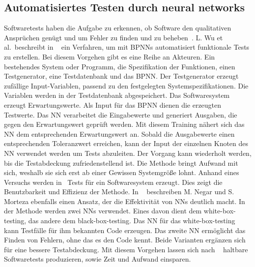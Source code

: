 \subsection{Automatisiertes Testen durch neural networks}
Softwaretests haben die Aufgabe zu erkennen, ob Software den qualitativen Ansprüchen genügt und um Fehler zu finden und zu beheben~\cite{Wu2008}.
L. Wu et al.~beschreibt in ~\cite{Wu2008} ein Verfahren, um mit BPNNs automatisiert funktionale Tests zu erstellen. 
Bei diesem Vorgehen gibt es eine Reihe an Akteuren. Ein bestehendes System oder Programm, die Spezifikation der Funktionen, einen Testgenerator, eine Testdatenbank und das BPNN. Der Testgenerator erzeugt zufällige Input-Variablen, passend zu den festgelegten Systemspezifikationen. Die Variablen werden in der Testdatenbank abgespeichert. Das Softwaresystem erzeugt Erwartungswerte. Als Input für das BPNN dienen die erzeugten Testwerte. Das NN verarbeitet die Eingabewerte und generiert Ausgaben, die gegen den Erwartungswert geprüft werden.
Mit diesem Training nähert sich das NN dem entsprechenden Erwartungswert an.
Sobald die Ausgabewerte einen entsprechenden Toleranzwert erreichen, kann der Input der einzelnen Knoten des NN verwendet werden um Tests abzuleiten. Der Vorgang kann wiederholt werden, bis die Testabdeckung zufriedenstellend ist. Die Methode bringt Aufwand mit sich, weshalb sie sich erst ab einer Gewissen Systemgröße lohnt. Anhand eines Versuchs werden in~\cite{Wu2008} Tests für ein Softwaresystem erzeugt. Dies zeigt die Benutzbarkeit und Effizienz der Methode.
\noindent In ~\cite{Majma2014} beschreiben M. Negar und S. Morteza ebenfalls einen Ansatz, der die Effektivität von NNs deutlich macht. In der Methode werden zwei NNs verwendet. Eines davon dient dem white-box-testing, das andere dem black-box-testing. Das NN für das white-box-testing kann Testfälle für ihm bekannten Code erzeugen. Das zweite NN ermöglicht das Finden von Fehlern, ohne das es den Code kennt. Beide Varianten ergänzen sich für eine bessere Testabdeckung. Mit diesem Vorgehen lassen sich nach ~\cite{Majma2014} haltbare Softwaretests produzieren, sowie Zeit und Aufwand einsparen.

